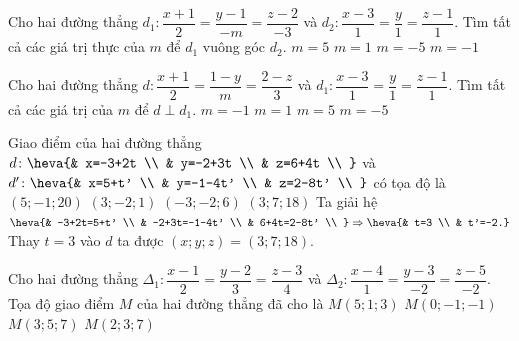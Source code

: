 \begin{ex}
	Cho hai đường thẳng $d_1:\dfrac{x+1}{2}=\dfrac{y-1}{-m}=\dfrac{z-2}{-3}$ và $d_2: \dfrac{x-3}{1}=\dfrac{y}{1}=\dfrac{z-1}{1}$. Tìm tất cả các giá trị thực của $m$ để $d_1$ vuông góc $d_2$.
	\choice
	{$m=5$}
	{$m=1$}
	{$m=-5$}
	{\True$m=-1$}
\end{ex}
\begin{ex}%
	Cho hai đường thẳng $d:\dfrac{x+1}{2}=\dfrac{1-y}{m}=\dfrac{2-z}{3}$ và $d_{1}:\dfrac{x-3}{1}=\dfrac{y}{1}=\dfrac{z-1}{1}$. Tìm tất cả các giá trị của $m$ để $d\perp d_{1}$.
	\choice
	{$m=-1$}
	{$m=1$}
	{$m=5$}
	{\True $m=-5$}
\end{ex}
\begin{ex}%
	Giao điểm của hai đường thẳng
	$d \colon \heva{& x=-3+2t \\
		& y=-2+3t \\
		& z=6+4t \\
	}$ và $d' \colon \heva{& x=5+t' \\
		& y=-1-4t' \\
		& z=2-8t' \\
	}$ có tọa độ là
	\choice
	{$(5;-1;20)$}
	{$(3;-2;1)$}
	{$(-3;-2;6)$}
	{\True $(3;7;18)$}
	\loigiai
	{Ta giải hệ $\heva{& -3+2t=5+t' \\
			& -2+3t=-1-4t' \\
			& 6+4t=2-8t' \\
		} \Rightarrow \heva{& t=3 \\
			& t'=-2.}$ \\
		Thay $t=3$ vào $d$ ta được $(x;y;z )=(3;7;18)$.}
\end{ex}
\begin{ex}%
	Cho hai đường thẳng $\Delta_1\colon \dfrac{x-1}{2}=\dfrac{y-2}{3}=\dfrac{z-3}{4}$ và $\Delta_2\colon \dfrac{x-4}{1}=\dfrac{y-3}{-2}=\dfrac{z-5}{-2}$. Tọa độ giao điểm $M$ của hai đường thẳng đã cho là
	\choice
	{$M(5;1;3)$}
	{$M(0;-1;-1)$}
	{\True $M(3;5;7)$}
	{$M(2;3;7)$}
\end{ex}
